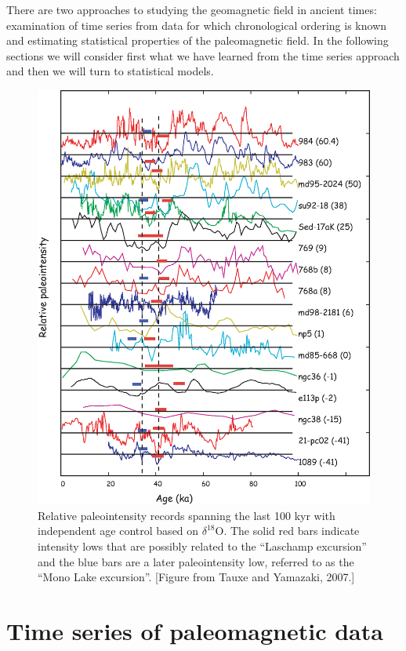   There are two approaches to studying the geomagnetic field in ancient times:  examination of time series from data for which chronological  ordering is known and estimating statistical properties of the paleomagnetic field.      
 In the following sections we will consider first what we have learned from the time series approach and then we will turn to statistical models.    
 
  \begin{figure}[p]
\centering  \includegraphics[width=14.5 cm]{EPSfiles/sedpint.eps}
\caption{Relative paleointensity records spanning the last 100 kyr with independent age control based on $\delta^{18}$O.  The solid red bars indicate intensity lows that are possibly related to the  ``Laschamp excursion'' and the blue bars are a later paleointensity low,  referred to as the ``Mono Lake excursion''. [Figure from Tauxe and Yamazaki, 2007.] } 
\label{fig:sedpint}
\end{figure}

 
\section{Time series of paleomagnetic data}   

